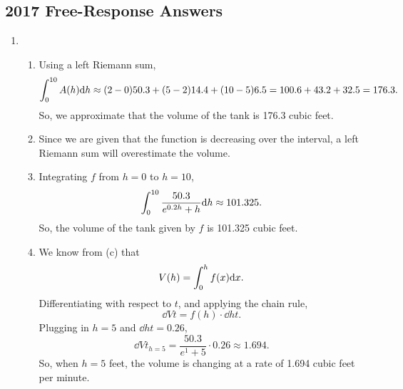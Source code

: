 \subsection{2017 Free-Response Answers}

\begin{enumerate}
	\item \begin{enumerate}
		\item Using a left Riemann sum,
			\begin{equation*}
				\int_{0}^{10}{A(h)\mathrm{d} h} \approx (2-0)50.3 + (5-2)14.4 + (10-5)6.5 = 100.6 + 43.2 + 32.5 = 176.3.
 			\end{equation*}
 			So, we approximate that the volume of the tank is 176.3 cubic feet.
 		\item Since we are given that the function is decreasing over the interval, a left Riemann sum will overestimate the volume.
 		\item Integrating $f$ from $h=0$ to $h=10$,
 			\begin{equation*}
 				\int_{0}^{10}{\frac{50.3}{e^{0.2h}+h}\mathrm{d} h} \approx 101.325.
 			\end{equation*}
 			So, the volume of the tank given by $f$ is 101.325 cubic feet.
 		\item We know from (c) that
 			\begin{equation*}
 				V(h) = \int_{0}^{h}{f(x)\mathrm{d} x}.
 			\end{equation*}
 			Differentiating with respect to $t$, and applying the chain rule,
 			\begin{equation*}
 				\dd{V}{t} = f(h)\cdot\dd{h}{t}.
 			\end{equation*}
 			Plugging in $h=5$ and $\dd{h}{t}=0.26$,
 			\begin{equation*}
 				\dd{V}{t}_{h=5} = \frac{50.3}{e^1 + 5}\cdot 0.26 \approx 1.694.
 			\end{equation*}
 			So, when $h=5$ feet, the volume is changing at a rate of 1.694 cubic feet per minute.
	\end{enumerate}


\end{enumerate}
